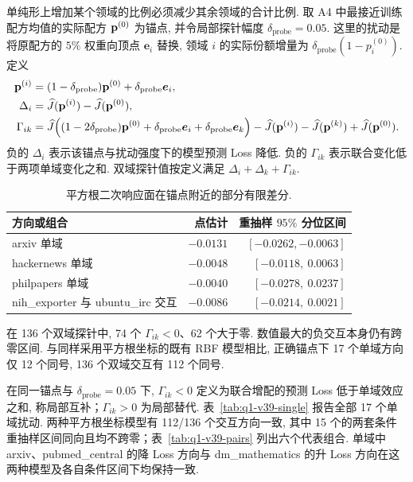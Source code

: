单纯形上增加某个领域的比例必须减少其余领域的合计比例. 取 A4 中最接近训练配方均值的实际配方 $\mathbf p^{(0)}$ 为锚点, 并令局部探针幅度 $\delta_{\mathrm{probe}}=0.05$. 这里的扰动是将原配方的 $5\%$ 权重向顶点 $\boldsymbol e_i$ 替换, 领域 $i$ 的实际份额增量为 $\delta_{\mathrm{probe}}(1-p_i^{(0)})$. 定义
\begin{subequations}
    \begin{align}\label{eq:effects}
\mathbf p^{(i)}&=(1-\delta_{\mathrm{probe}})\mathbf p^{(0)}+\delta_{\mathrm{probe}}\boldsymbol e_i, \\
\Delta_i&=\widehat J(\mathbf p^{(i)})
          -\widehat J(\mathbf p^{(0)}), \\
\Gamma_{ik}&=
\widehat J\!\left((1-2\delta_{\mathrm{probe}})\mathbf p^{(0)}+
               \delta_{\mathrm{probe}}\boldsymbol e_i+\delta_{\mathrm{probe}}\boldsymbol e_k\right)
-\widehat J(\mathbf p^{(i)})
-\widehat J(\mathbf p^{(k)})
+\widehat J(\mathbf p^{(0)}).
\end{align}
\end{subequations}
负的 $\Delta_i$ 表示该锚点与扰动强度下的模型预测 Loss 降低. 负的 $\Gamma_{ik}$ 表示联合变化低于两项单域变化之和. 双域探针值按定义满足 $\Delta_i+\Delta_k+\Gamma_{ik}$.

\begin{table}[htbp]\centering\small
\caption{平方根二次响应面在锚点附近的部分有限差分.}\label{tab:effects}
\begin{tabular}{lrr}\toprule
方向或组合 & 点估计 & 重抽样 $95\%$ 分位区间\\\midrule
arxiv 单域 & $-0.0131$ & $[-0.0262, -0.0063]$\\
hackernews 单域 & $-0.0048$ & $[-0.0118, \ 0.0063]$\\
philpapers 单域 & $-0.0040$ & $[-0.0278, \ 0.0237]$\\
nih\_exporter 与 ubuntu\_irc 交互 & $-0.0086$ & $[-0.0214, \ 0.0021]$\\\bottomrule
\end{tabular}
\end{table}

在 136 个双域探针中, 74 个 $\Gamma_{ik}<0$、62 个大于零. 数值最大的负交互本身仍有跨零区间. 与同样采用平方根坐标的既有 RBF 模型相比, 正确锚点下 17 个单域方向仅 12 个同号, 136 个双域交互有 112 个同号. %



在同一锚点与 $\delta_{\mathrm{probe}}=0.05$ 下, $\Gamma_{ik}<0$ 定义为联合增配的预测 Loss 低于单域效应之和, 称局部互补；$\Gamma_{ik}>0$ 为局部替代. 表~\ref{tab:q1-v39-single} 报告全部 17 个单域扰动. 两种平方根坐标模型有 112/136 个交互方向一致, 其中 15 个的两套条件重抽样区间同向且均不跨零；表~\ref{tab:q1-v39-pairs} 列出六个代表组合. 单域中 arxiv、pubmed\_central 的降 Loss 方向与 dm\_mathematics 的升 Loss 方向在这两种模型及各自条件区间下均保持一致. %

